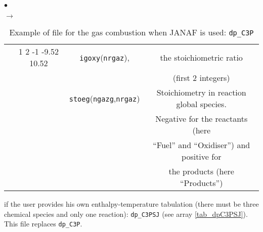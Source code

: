 {{\begin{list}{$\bullet$}{}
\begin{list}{$\rightarrow$}{}
\begin{table}[htbp]
\begin{center}
{\begin{tabular}{|c|c|c|c|}
        & 1 2 -1 -9.52 10.52&  \texttt{igoxy\index{igoxy}}(\texttt{nrgaz}),  & the stoichiometric ratio                         \\
        &                   &                              & (first 2 integers)                               \\
        &                   &\texttt{stoeg\index{stoeg}}(\texttt{ngazg},\texttt{nrgaz})& Stoichiometry in reaction global species.       \\
        &                   &                               & Negative for the reactants (here                \\
        &                   &                               & ``Fuel'' and ``Oxidiser'') and positive for      \\
        &                   &                               & the products (here ``Products'')                \\ \hline
\end{tabular}
}
\caption{Example of file for the gas combustion when JANAF is used: \texttt{dp\_C3P}}\label{tab_dpC3P}
\end{center}
\end{table}

               \item if the user provides his own enthalpy-temperature tabulation
                     (there must be three chemical species and only
                     one reaction): \texttt{dp\_C3PSJ} (see
                     array \ref{tab_dpC3PSJ}). This file replaces \texttt{dp\_C3P}.


\end{list}
\end{list}}}
